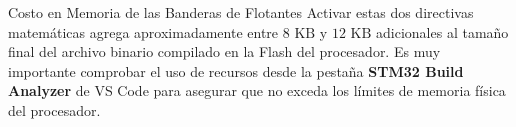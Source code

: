 \documentclass[
10pt, %
a4paper, %
oneside, %
headinclude,footinclude, %
BCOR5mm, %
]{scrartcl}
\begin{document}
\begin{InfoBox}{Costo en Memoria de las Banderas de Flotantes}
	Activar estas dos directivas matemáticas agrega aproximadamente entre $8\text{ KB}$ y $12\text{ KB}$ adicionales al tamaño final del archivo binario compilado en la Flash del procesador. Es muy importante comprobar el uso de recursos desde la pestaña \textbf{STM32 Build Analyzer} de VS Code para asegurar que no exceda los límites de memoria física del procesador.
\end{InfoBox}



%


\end{document}
